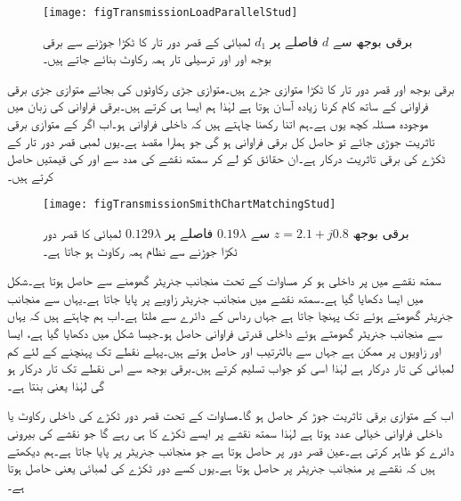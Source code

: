 \begin{figure}
\centering
\texttt{[image: figTransmissionLoadParallelStud]}
\caption{برقی بوجھ سے $d$ فاصلے پر $d_1$ لمبائی کے قصر دور تار کا ٹکڑا جوڑنے سے برقی بوجھ اور اور ترسیلی تار ہمہ رکاوٹ بنائے جاتے ہیں۔}
\label{شکل_ترسیلی_ہمہ_رکاوٹی_بمدد_ٹکڑا_تار}
\end{figure}

برقی بوجھ اور قصر دور تار کا ٹکڑا متوازی جڑے ہیں۔متوازی جڑی رکاوٹوں کی بجائے متوازی جڑی برقی فراوانی کے ساتھ کام کرنا زیادہ آسان ہوتا ہے لہٰذا ہم ایسا ہی کرتے ہیں۔برقی فراوانی کی زبان میں موجودہ مسئلہ کچھ یوں ہے۔ہم  اتنا رکھنا چاہتے ہیں کہ داخلی فراوانی  ہو۔اب اگر  کے متوازی  برقی تاثریت جوڑی جائے تو حاصل کل برقی فراوانی  ہو گی جو ہمارا مقصد ہے۔یوں  لمبی قصر دور تار کے ٹکڑے کی برقی تاثریت  درکار ہے۔ان حقائق کو لے کر سمتھ نقشے کی مدد سے  اور  کی قیمتیں حاصل کرتے ہیں۔

\begin{figure}
\centering
\texttt{[image: figTransmissionSmithChartMatchingStud]}
\caption{برقی بوجھ $z=2.1+j0.8$ سے $0.19\lambda$ فاصلے پر $0.129\lambda$ لمبائی کا قصر دور ٹکڑا جوڑنے سے نظام ہمہ رکاوٹ ہو جاتا ہے۔}
\label{شکل_ترسیلی_ہمہ_رکاوٹی_ٹکڑے_کا_نقشہ}
\end{figure}

سمتھ نقشے میں  پر داخلی ہو کر مساوات  کے تحت منجانب جنریٹر  گھومنے سے  حاصل ہوتا ہے۔شکل  میں ایسا دکھایا گیا ہے۔سمتھ نقشے میں  منجانب جنریٹر  زاویے پر پایا جاتا ہے۔یہاں سے منجانب جنریٹر  گھومتے ہوئے  تک پہنچا جاتا ہے جہاں  رداس کے دائرے سے  ملتا ہے۔اب ہم چاہتے ہیں کہ یہاں سے  منجانب جنریٹر  گھومتے ہوئے  داخلی قدرتی فراوانی  حاصل ہو۔جیسا شکل میں دکھایا گیا ہے، ایسا  اور  زاویوں پر ممکن ہے جہاں سے بالترتیب  اور   حاصل ہوتے ہیں۔پہلے نقطے تک پہنچنے کے لئے کم لمبائی کی تار درکار ہے لہٰذا اسی کو جواب تسلیم کرتے ہیں۔برقی بوجھ سے اس نقطے تک  تار درکار ہو گی لہٰذا  یعنی  بنتا ہے۔

 اب  کے متوازی  برقی تاثریت جوڑ کر  حاصل ہو گا۔مساوات  کے تحت قصر دور ٹکڑے کی داخلی رکاوٹ یا داخلی فراوانی خیالی عدد ہوتا ہے لہٰذا سمتھ نقشے پر ایسے ٹکڑے کا  ہی رہے گا جو نقشے کی بیرونی دائرے کو ظاہر کرتی ہے۔عین قصر دور پر  حاصل ہوتا ہے جو منجانب جنریٹر   پر پایا جاتا ہے۔ہم دیکھتے ہیں کہ  نقشے پر منجانب جنریٹر  پر حاصل ہوتا ہے۔یوں کسے دور ٹکڑے کی لمبائی  یعنی  حاصل ہوتا ہے۔   

